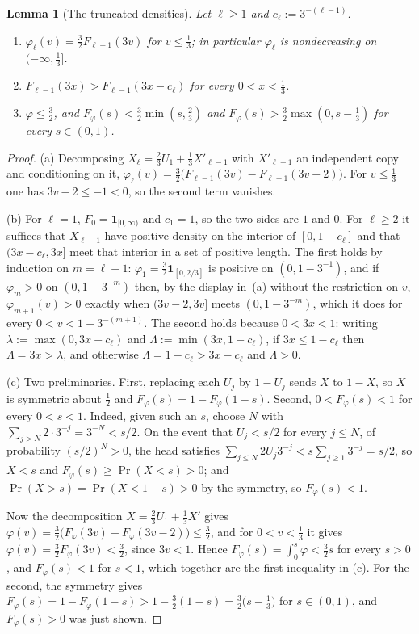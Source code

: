 \documentclass[11pt]{article}
\newtheorem{lemma}[theorem]{Lemma}
\theoremstyle{definition}
\theoremstyle{remark}
\begin{document}
\begin{lemma}[The truncated densities]\label{lem:trunc}
Let $\ell\ge1$ and $c_\ell:=3^{-(\ell-1)}$.
\begin{enumerate}
\item[(a)] $\varphi_\ell(v)=\tfrac32F_{\ell-1}(3v)$ for $v\le\tfrac13$;
  in particular $\varphi_\ell$ is nondecreasing on
  $(-\infty,\tfrac13]$.
\item[(b)] $F_{\ell-1}(3x)>F_{\ell-1}(3x-c_\ell)$ for every
  $0<x<\tfrac13$.
\item[(c)] $\varphi\le\tfrac32$, and $F_\varphi(s)<\tfrac32
  \min(s,\tfrac23)$ and $F_\varphi(s)>\tfrac32\max(0,s-\tfrac13)$ for
  every $s\in(0,1)$.
\end{enumerate}
\end{lemma}

\begin{proof}
(a) Decomposing $X_\ell=\tfrac23U_1+\tfrac13X'_{\ell-1}$ with
$X'_{\ell-1}$ an independent copy and conditioning on it,
$\varphi_\ell(v)=\tfrac32\bigl(F_{\ell-1}(3v)-F_{\ell-1}(3v-2)\bigr)$.
For $v\le\tfrac13$ one has $3v-2\le-1<0$, so the second term vanishes.

(b) For $\ell=1$, $F_0=\mathbf1_{[0,\infty)}$ and $c_1=1$, so the two
sides are $1$ and $0$. For $\ell\ge2$ it suffices that $X_{\ell-1}$ have
positive density on the interior of $[0,1-c_\ell]$ and that
$(3x-c_\ell,3x]$ meet that interior in a set of positive length. The
first holds by induction on $m=\ell-1$: $\varphi_1=\tfrac32
\mathbf1_{[0,2/3]}$ is positive on $(0,1-3^{-1})$, and if $\varphi_m>0$
on $(0,1-3^{-m})$ then, by the display in~(a) without the restriction on
$v$, $\varphi_{m+1}(v)>0$ exactly when $(3v-2,3v]$ meets
$(0,1-3^{-m})$, which it does for every $0<v<1-3^{-(m+1)}$. The second
holds because $0<3x<1$: writing $\lambda:=\max(0,3x-c_\ell)$ and
$\Lambda:=\min(3x,1-c_\ell)$, if $3x\le1-c_\ell$ then
$\Lambda=3x>\lambda$, and otherwise $\Lambda=1-c_\ell>3x-c_\ell$ and
$\Lambda>0$.

(c) Two preliminaries. First, replacing each $U_j$ by $1-U_j$ sends $X$
to $1-X$, so $X$ is symmetric about $\tfrac12$ and
$F_\varphi(s)=1-F_\varphi(1-s)$. Second, $0<F_\varphi(s)<1$ for every
$0<s<1$.
Indeed, given such an $s$, choose $N$ with
$\sum_{j>N}2\cdot3^{-j}=3^{-N}<s/2$. On the event that $U_j<s/2$ for
every $j\le N$, of probability $(s/2)^N>0$, the head satisfies
$\sum_{j\le N}2U_j3^{-j}<s\sum_{j\ge1}3^{-j}=s/2$, so $X<s$ and
$F_\varphi(s)\ge\Pr(X<s)>0$; and $\Pr(X>s)=\Pr(X<1-s)>0$ by the
symmetry, so $F_\varphi(s)<1$.

Now the decomposition $X=\tfrac23U_1+\tfrac13X'$ gives
$\varphi(v)=\tfrac32\bigl(F_\varphi(3v)-F_\varphi(3v-2)\bigr)\le\tfrac32$,
and for $0<v<\tfrac13$ it gives $\varphi(v)=\tfrac32F_\varphi(3v)
<\tfrac32$, since $3v<1$. Hence $F_\varphi(s)=\int_0^s\varphi<\tfrac32s$
for every $s>0$, and $F_\varphi(s)<1$ for $s<1$, which together are the
first inequality in (c). For the second, the symmetry gives
$F_\varphi(s)=1-F_\varphi(1-s)>1-\tfrac32(1-s)=\tfrac32\bigl(s-\tfrac13\bigr)$
for $s\in(0,1)$, and $F_\varphi(s)>0$ was just shown.
\end{proof}
\end{document}
